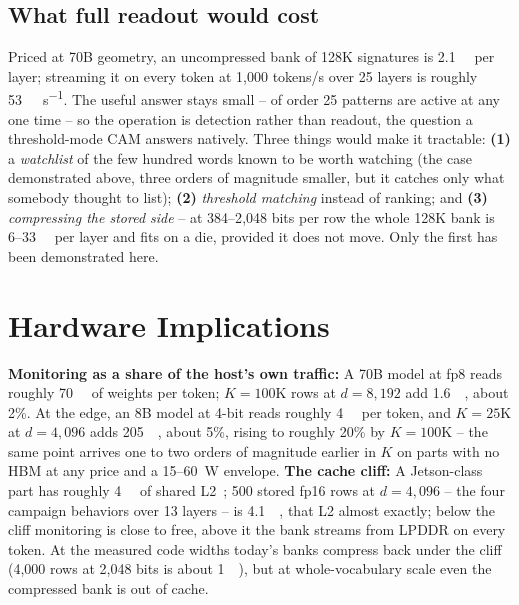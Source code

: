 \documentclass[conference]{IEEEtran}
\newcommand{\cam}{{CAM}\xspace}
\begin{document}
\subsection{What full readout would cost}
\label{subsec:ReadoutCost}
Priced at 70B geometry, an uncompressed bank of 128K signatures is
\qty{2.1}{\giga\byte} per layer; streaming it on every token at
1{,}000 tokens/s over 25 layers is roughly
\qty{53}{\tera\byte\per\second}. The useful answer stays small -- of order 25 patterns are
active at any one time -- so the operation is detection rather than
readout, the question a threshold-mode \cam answers natively. Three
things would make it tractable: {\bf (1)} a \emph{watchlist} of the
few hundred words known to be worth watching (the case demonstrated
above, three orders of magnitude smaller, but it catches only what
somebody thought to list); {\bf (2)} \emph{threshold matching}
instead of ranking; and {\bf (3)} \emph{compressing the stored side}
-- at 384--2{,}048 bits per row the whole 128K bank is
6--\qty{33}{\mega\byte} per layer and fits on a die, provided it does
not move. Only the first has been demonstrated here.

\section{Hardware Implications}
\label{sec:Hardware}
\label{subsec:Tax}
\label{subsec:CacheCliff}
\textbf{Monitoring as a share of the host's own traffic:} A 70B
model at fp8 reads roughly \qty{70}{\giga\byte} of weights per
token; $K=100$K rows at $d=8{,}192$ add \qty{1.6}{\giga\byte}, about
2\%. At the edge, an 8B model at 4-bit reads roughly
\qty{4}{\giga\byte} per token, and $K=25$K at $d=4{,}096$ adds
\qty{205}{\mega\byte}, about 5\%, rising to roughly 20\% by
$K=100$K -- the same point arrives one to two orders of magnitude
earlier in $K$ on parts with no HBM at any price and a
15--\qty{60}{\watt} envelope.
\textbf{The cache cliff:} A Jetson-class part has roughly
\qty{4}{\mega\byte} of shared L2~\cite{nvidia_thor}; 500 stored fp16
rows at $d=4{,}096$ -- the four campaign behaviors over 13 layers --
is \qty{4.1}{\mega\byte}, that L2 almost exactly; below the cliff
monitoring is close to free, above it the bank streams from LPDDR on
every token. At the measured code widths today's banks compress back
under the cliff (4{,}000 rows at 2{,}048 bits is about
\qty{1}{\mega\byte}), but at whole-vocabulary scale even the
compressed bank is out of cache.
\end{document}

